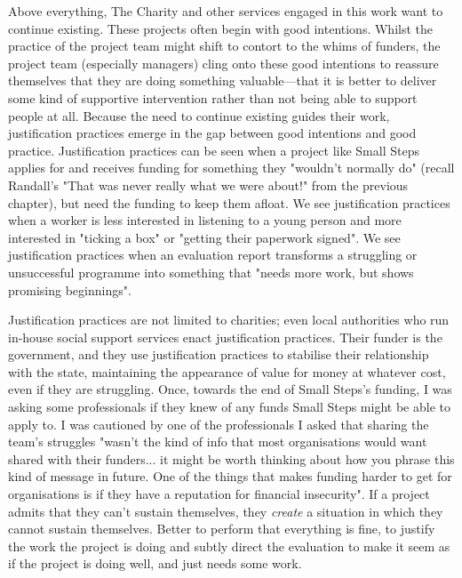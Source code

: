 Above everything, The Charity and other services engaged in this work want to continue existing. These projects often begin with good intentions. Whilst the practice of the project team might shift to contort to the whims of funders, the project team (especially managers) cling onto these good intentions to reassure themselves that they are doing something valuable—that it is better to deliver some kind of supportive intervention rather than not being able to support people at all. Because the need to continue existing guides their work, justification practices emerge in the gap between good intentions and good practice. Justification practices can be seen when a project like Small Steps applies for and receives funding for something they "wouldn't normally do" (recall Randall's "That was never really what we were about!" from the previous chapter), but need the funding to keep them afloat. We see justification practices when a worker is less interested in listening to a young person and more interested in "ticking a box" or "getting their paperwork signed". We see justification practices when an evaluation report transforms a struggling or unsuccessful programme into something that "needs more work, but shows promising beginnings". 

Justification practices are not limited to charities; even local authorities who run in-house social support services enact justification practices. Their funder is the government, and they use justification practices to stabilise their relationship with the state, maintaining the appearance of value for money at whatever cost, even if they are struggling. Once, towards the end of Small Steps's funding, I was asking some professionals if they knew of any funds Small Steps might be able to apply to. I was cautioned by one of the professionals I asked that sharing the team's struggles "wasn't the kind of info that most organisations would want shared with their funders... it might be worth thinking about how you phrase this kind of message in future. One of the things that makes funding harder to get for organisations is if they have a reputation for financial insecurity". If a project admits that they can't sustain themselves, they \emph{create} a situation in which they cannot sustain themselves. Better to perform that everything is fine, to justify the work the project is doing and subtly direct the evaluation to make it seem as if the project is doing well, and just needs some work. 

